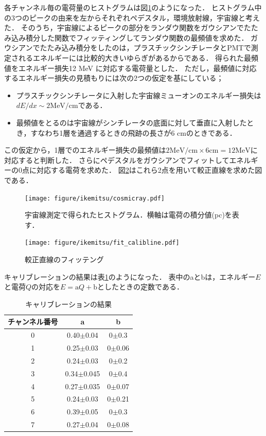  各チャンネル毎の電荷量のヒストグラムは図\ref{cosmicray}のようになった．
 ヒストグラム中の3つのピークの由来を左からそれぞれペデスタル，環境放射線，宇宙線と考えた．
 そのうち，宇宙線によるピークの部分をランダウ関数をガウシアンでたたみ込み積分した関数でフィッティングしてランダウ関数の最頻値を求めた．
 ガウシアンでたたみ込み積分をしたのは，プラスチックシンチレータとPMTで測定されるエネルギーには比較的大きいゆらぎがあるからである．
 得られた最頻値をエネルギー損失12 MeV に対応する電荷量とした．
 ただし，最頻値に対応するエネルギー損失の見積もりには次の2つの仮定を基にしている；
 \begin{itemize}
  \item プラスチックシンチレータに入射した宇宙線ミューオンのエネルギー損失は$dE/dx\sim 2 \mathrm{ MeV /cm}$である．
  \item 最頻値をとるのは宇宙線がシンチレータの底面に対して垂直に入射したとき，すなわち1層を通過するときの飛跡の長さが6 cmのときである．
 \end{itemize}
 この仮定から，1層でのエネルギー損失の最頻値は$2\mathrm{ MeV /cm}\times6\mathrm{ cm} = 12\mathrm{ MeV }$に対応すると判断した．
 さらにペデスタルをガウシアンでフィットしてエネルギーの0点に対応する電荷を求めた．
 図\ref{PS_calib}はこれら2点を用いて較正直線を求めた図である．
 \begin{figure}[H]
  \centering
  \texttt{[image: figure/ikemitsu/cosmicray.pdf]}
  \caption{宇宙線測定で得られたヒストグラム．横軸は電荷の積分値(pc)を表す．}
  \label{cosmicray}
 \end{figure}%
 \begin{figure}[H]
  \centering
  \texttt{[image: figure/ikemitsu/fit\_calibline.pdf]}
  \caption{較正直線のフィッテング}
  \label{PS_calib}
 \end{figure}%

 キャリブレーションの結果は表\ref{PS_calib_table}のようになった．
 表中のaとbは，エネルギー$E$と電荷$Q$の対応を$E = \mathrm{a}Q + \mathrm{b}$としたときの定数である．
 \begin{table}[h]
  \caption{キャリブレーションの結果}
  \label{PS_calib_table}
  \begin{center}
   \begin{tabular}{ccc}\toprule
    チャンネル番号&a &b \\ \hline
    0& 0.40$\pm$0.04 &0$\pm$0.3 \\
    1& 0.25$\pm$0.03 &0$\pm$0.06 \\
    2& 0.24$\pm$0.03 &0$\pm$0.2 \\
    3& 0.34$\pm$0.045 &0$\pm$0.4 \\
    4& 0.27$\pm$0.035 &0$\pm$0.07 \\
    5& 0.24$\pm$0.03 &0$\pm$0.21 \\
    6& 0.39$\pm$0.05 &0$\pm$0.3 \\
    7& 0.27$\pm$0.04 &0$\pm$0.08 \\ \bottomrule
   \end{tabular}
  \end{center}
 \end{table}%

